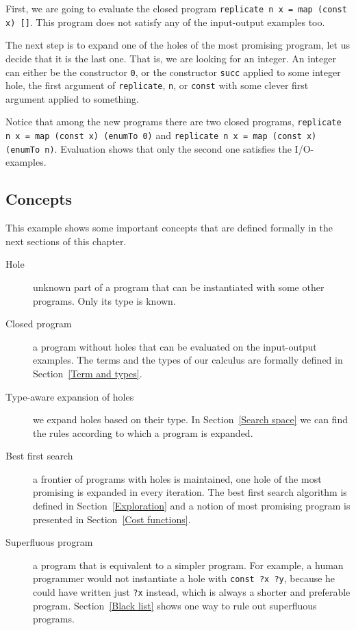 First, we are going to evaluate the closed program \lstinline?replicate n x = map (const x) []?. This program does not satisfy any of the input-output examples too.

The next step is to expand one of the holes of the most promising program, let us decide that it is the last one. That is, we are looking for an integer. An integer can either be the constructor \lstinline?0?, or the constructor \lstinline?succ? applied to some integer hole, the first argument of \lstinline?replicate?, \lstinline?n?, or \lstinline?const? with some clever first argument applied to something.

Notice that among the new programs there are two closed programs, \lstinline?replicate n x = map (const x) (enumTo 0)? and \lstinline?replicate n x = map (const x) (enumTo n)?. Evaluation shows that only the second one satisfies the I/O-examples.

\subsection{Concepts}

This example shows some important concepts that are defined formally in the next sections of this chapter.
\begin{description}
\item[Hole] unknown part of a program that can be instantiated with some other programs. Only its type is known.
\item[Closed program] a program without holes that can be evaluated on the input-output examples. The terms and the types of our calculus are formally defined in Section~\ref{Term and types}.
\item[Type-aware expansion of holes] we expand holes based on their type. In Section~\ref{Search space} we can find the rules according to which a program is expanded.
\item[Best first search] a frontier of programs with holes is maintained, one hole of the most promising is expanded in every iteration. The best first search algorithm is defined in Section~\ref{Exploration} and a notion of most promising program is presented in Section~\ref{Cost functions}.
\item[Superfluous program] a program that is equivalent to a simpler program. For example, a human programmer would not instantiate a hole with \lstinline!const ?x ?y!, because he could have written just \lstinline!?x! instead, which is always a shorter and preferable program. Section~\ref{Black list} shows one way to rule out superfluous programs.
\end{description}
 
